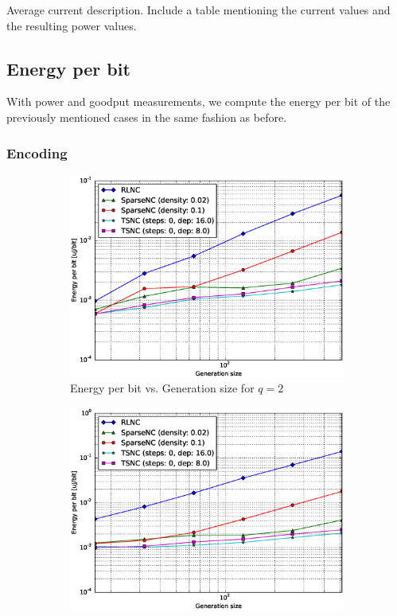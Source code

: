 Average current description. Include a table mentioning the current values
and the resulting power values.

\subsection{Energy per bit}
With power and goodput measurements, we compute the energy per bit of
the previously mentioned cases in the same fashion as before.

\subsubsection{Encoding}

\begin{figure}
    \centering
    \begin{subfigure}[b]{0.475\textwidth}
        \centering
        \includegraphics[width=1.1\textwidth]{images/23_07_2015/energy_per_bit_vs_generation_size_Rasp_Binary_encoder_1600.eps}
        \caption[]%
        {{\small Energy per bit vs. Generation size for $q = 2$}}    
        \label{fig:enc_ene_rasp1_gen_gf2}
    \end{subfigure}
    \hfill
    \begin{subfigure}[b]{0.475\textwidth}  
        \centering 
        \includegraphics[width=1.1\textwidth]{images/23_07_2015/energy_per_bit_vs_generation_size_Rasp_Binary8_encoder_1600.eps}

\end{subfigure}
\end{figure}
